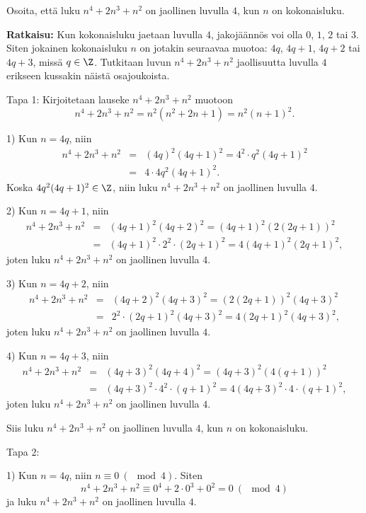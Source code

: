 \begin{esimerkki}
Osoita, että luku $n^4 + 2n^3 + n^2$ on
jaollinen luvulla $4$, kun $n$ on kokonaisluku.

{\bf Ratkaisu:}
Kun kokonaisluku jaetaan luvulla $4$, jakojäännös voi olla $0$,
$1$, $2$ tai $3$. Siten jokainen kokonaisluku $n$ on jotakin
seuraavaa muotoa: $4q$, $4q + 1$, $4q + 2$ tai $4q + 3$, missä
$q\in\Z$. Tutkitaan luvun $n^4 + 2n^3 + n^2$ jaollisuutta luvulla
$4$ erikseen kussakin näistä osajoukoista.

Tapa 1: Kirjoitetaan lauseke $n^4 + 2n^3 + n^2$ muotoon
\[
n^4 + 2n^3 + n^2 = n^2 (n^2 + 2n + 1) = n^2 (n + 1)^2.
\]

1) Kun $n = 4q$, niin
\begin{eqnarray*}
n^4 + 2n^3 + n^2 &=& (4q)^2(4q + 1)^2 = 4^2 \cdot q^2 (4q + 1)
^2\\
&=& 4 \cdot 4q^2 (4q + 1)^2.
\end{eqnarray*}
Koska $4q^2 (4q + 1)^2 \in \Z$, niin luku $n^4 + 2n^3 + n^2$ on jaollinen luvulla $4$.

2) Kun $n = 4q + 1$, niin
\begin{eqnarray*}
n^4 + 2n^3 + n^2 &=& (4q+1)^2(4q + 2)^2 = (4q+1)^2 (2(2q + 1))
^2\\
&=& (4q+1)^2 \cdot 2^2 \cdot (2q + 1)^2 = 4(4q+1)^2 (2q + 1)^2,
\end{eqnarray*}
joten luku $n^4 + 2n^3 + n^2$ on jaollinen luvulla $4$.

3) Kun $n = 4q + 2$, niin
\begin{eqnarray*}
n^4 + 2n^3 + n^2 &=& (4q+2)^2(4q + 3)^2 = (2(2q+1))^2 (4q + 3)
^2\\
&=& 2^2 \cdot (2q+1)^2 (4q + 3)^2 = 4(2q+1)^2 (4q + 3)^2,
\end{eqnarray*}
joten luku $n^4 + 2n^3 + n^2$ on jaollinen luvulla $4$.

4) Kun $n = 4q + 3$, niin
\begin{eqnarray*}
n^4 + 2n^3 + n^2 &=& (4q+3)^2(4q + 4)^2 = (4q+3)^2 (4(q + 1))^2\\
&=& (4q+3)^2 \cdot 4^2 \cdot (q + 1)^2 = 4(4q+3)^2 \cdot 4 \cdot
(q + 1)^2,
\end{eqnarray*}
joten luku $n^4 + 2n^3 + n^2$ on jaollinen luvulla $4$.

Siis luku $n^4 + 2n^3 + n^2$ on jaollinen luvulla $4$, kun $n$ on
kokonaisluku.

Tapa 2:

1) Kun $n = 4q$, niin $n\equiv0\ (\mod 4)$. Siten
\[
n^4 + 2n^3 + n^2 \equiv 0^4 + 2 \cdot 0^3 + 0^2 = 0\ (\mod 4)
\]
ja luku $n^4 + 2n^3 + n^2$ on jaollinen luvulla $4$.


\end{esimerkki}
